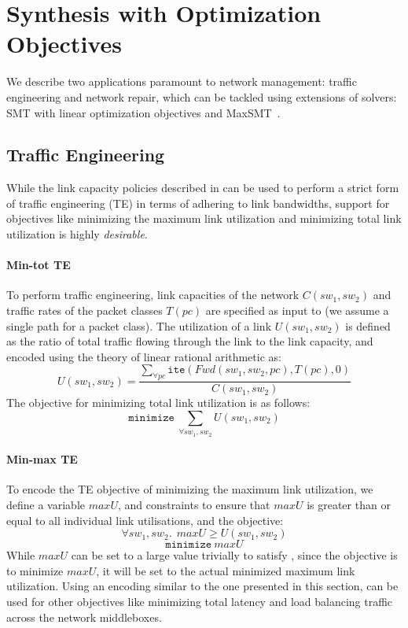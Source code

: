 \section{Synthesis with Optimization Objectives}
We describe two applications paramount to network management:
traffic engineering and network repair, which can be tackled using
extensions of solvers: SMT with linear optimization objectives and MaxSMT~\cite{maxsmt}.
\subsection{Traffic Engineering}
While the link capacity policies described in  can
be used to perform a strict form of traffic engineering (TE) in terms of 
adhering to link bandwidths, support for objectives
like minimizing the maximum link utilization and minimizing total link utilization
is highly \emph{desirable}.

\paragraph{Min-tot TE}
To perform traffic engineering, link capacities of the network $C(sw_1, sw_2)$ and traffic 
rates of the packet classes $T(pc)$ are specified as input to \name (we assume a single
path for a packet class). The utilization 
of a link $U(sw_1, sw_2)$ is defined as the ratio of total traffic flowing through the link to the 
link capacity, and encoded using the theory of linear rational arithmetic as:
\begin{equation}
U(sw_1, sw_2) = \frac{\sum_{\forall pc} \texttt{ite}(Fwd(sw_1,sw_2, pc), T(pc), 0)} {C(sw_1, sw_2)}
\end{equation}
The objective for minimizing total link utilization is as follows:
\begin{equation}
	\texttt{minimize}\ \sum_{\forall sw_1, sw_2} U(sw_1, sw_2)
\end{equation}
\paragraph{Min-max TE}
To encode the TE objective of minimizing the maximum link utilization, we define
a variable $maxU$, and constraints to ensure that $maxU$ is greater than or equal to all 
individual link utilisations, and the objective: 
\begin{equation} \label{eq:maxu}
\forall sw_1, sw_2.\ \ maxU \geq U(sw_1, sw_2)
\end{equation} 
\begin{equation}
		\texttt{minimize}\ maxU
\end{equation}
While $maxU$ can be set to a large value trivially to satisfy 
, since the objective is to minimize $maxU$, it will be set to the actual
minimized maximum link utilization. Using an encoding similar to the one presented in this section, \name can be used for other objectives like minimizing total latency and load balancing
traffic across the network middleboxes.

